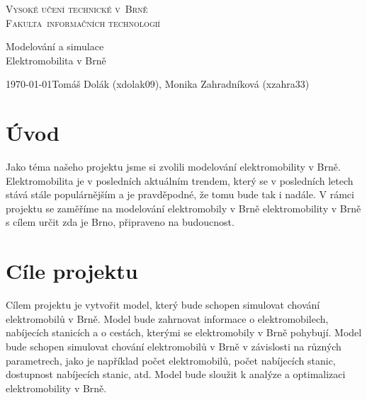 \documentclass[a4paper,11pt]{article}
\begin{document}
\begin{titlepage}
    \begin{center}
        
        \Huge
        \textsc{Vysoké učení technické v~Brně}\\[0.1em]
        
        \huge
        \textsc{Fakulta~informačních technologií}
        
        
        \LARGE
        Modelování a simulace \\
        Elektromobilita v Brně

    \end{center}
    
    {\Large \today \hfill Tomáš Dolák (xdolak09), Monika Zahradníková (xzahra33)}
\end{titlepage}

\newpage
\tableofcontents

\newpage
\label{firstpage}

\section{Úvod}
Jako téma našeho projektu jsme si zvolili modelování elektromobility v Brně. Elektromobilita je v posledních aktuálním trendem, 
který se v posledních letech stává stále populárnějším a je pravděpodné, že tomu bude tak i nadále. 
V rámci projektu se zaměříme na modelování elektromobily v Brně elektromobility v Brně s cílem určit zda je Brno, připraveno 
na budoucnost.\cite{simlib_cpp}

\section{Cíle projektu}
Cílem projektu je vytvořit model, který bude schopen simulovat chování elektromobilů v Brně. 
Model bude zahrnovat informace o elektromobilech, nabíjecích stanicích a o cestách, kterými 
se elektromobily v Brně pohybují. Model bude schopen simulovat chování elektromobilů v Brně 
v závislosti na různých parametrech, jako je například počet elektromobilů, počet nabíjecích 
stanic, dostupnost nabíjecích stanic, atd. Model bude sloužit k analýze a optimalizaci 
elektromobility v Brně.

\newpage

      
\end{document}
